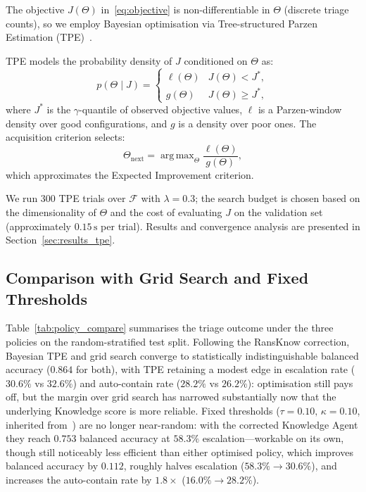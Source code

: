 \documentclass[journal]{IEEEtran}
\DeclareMathOperator*{\argmax}{arg\,max}
\begin{document}
The objective $J(\Theta)$ in~\eqref{eq:objective} is non-differentiable in
$\Theta$ (discrete triage counts), so we employ Bayesian optimisation via
Tree-structured Parzen Estimation (TPE)~\cite{bergstra_algorithms_2011}.

TPE models the probability density of $J$ conditioned on $\Theta$ as:
\begin{equation}\label{eq:tpe}
  p(\Theta \mid J) =
  \begin{cases}
    \ell(\Theta) & J(\Theta) < J^*, \\
    g(\Theta)    & J(\Theta) \geq J^*,
  \end{cases}
\end{equation}
where $J^*$ is the $\gamma$-quantile of observed objective values, $\ell$ is
a Parzen-window density over good configurations, and $g$ is a density over
poor ones. The acquisition criterion selects:
\begin{equation}\label{eq:ei}
  \Theta_{\text{next}} = \argmax_\Theta
  \frac{\ell(\Theta)}{g(\Theta)},
\end{equation}
which approximates the Expected Improvement criterion.

We run $300$ TPE trials over $\mathcal{F}$ with $\lambda = 0.3$; the search
budget is chosen based on the dimensionality of $\Theta$ and the cost of
evaluating $J$ on the validation set (approximately $0.15\,\text{s}$ per
trial). Results and convergence analysis are presented in
Section~\ref{sec:results_tpe}.

\subsection{Comparison with Grid Search and Fixed Thresholds}

Table~\ref{tab:policy_compare} summarises the triage outcome under the
three policies on the random-stratified test split. Following the
RansKnow correction, Bayesian TPE and grid search converge to
statistically indistinguishable balanced accuracy ($0.864$ for both),
with TPE retaining a modest edge in escalation rate ($30.6\%$ vs
$32.6\%$) and auto-contain rate ($28.2\%$ vs $26.2\%$): optimisation
still pays off, but the margin over grid search has narrowed
substantially now that the underlying Knowledge score is more reliable.
Fixed thresholds ($\tau{=}0.10,\,\kappa{=}0.10$, inherited
from~\cite{kabuye2026sabre}) are no longer near-random: with the
corrected Knowledge Agent they reach $0.753$ balanced accuracy at
$58.3\%$ escalation---workable on its own, though still
noticeably less efficient than either optimised policy, which improves
balanced accuracy by $0.112$, roughly halves escalation
($58.3\%\!\to\!30.6\%$), and increases the auto-contain rate by
$1.8\times$ ($16.0\%\!\to\!28.2\%$).
\end{document}

